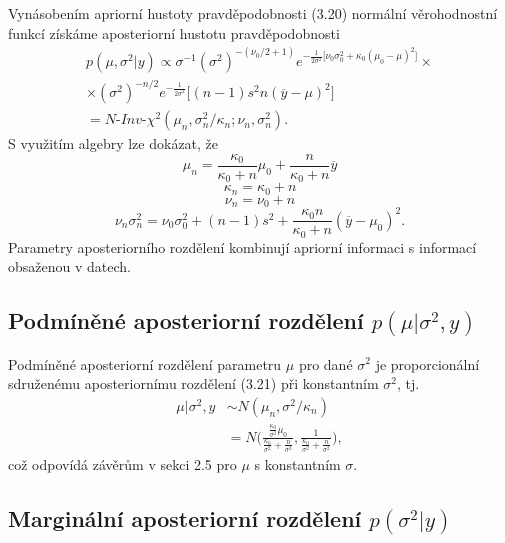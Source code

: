 Vynásobením apriorní hustoty pravděpodobnosti (3.20) normální věrohodnostní funkcí získáme aposteriorní hustotu pravděpodobnosti
\begin{multline}
p(\mu, \sigma^2 | y) \varpropto \sigma ^ {-1} (\sigma^2)^{-(\nu_0 / 2 + 1)}e^{-\frac{1}{2 \sigma ^ 2}\big[\nu_0 \sigma_0 ^ 2 + \kappa_0 (\mu_0 - \mu)^2 \big]} \times \\
\times (\sigma ^ 2) ^ {-n/2} e ^ {- \frac{1}{2 \sigma^2}}\big[(n - 1) s^2 n(\overline{y} - \mu) ^ 2 \big]\\
= \textit{N-Inv-}\chi^2(\mu_n, \sigma^2_n/ \kappa_n; \nu_n, \sigma_n^2).
\end{multline}
S využitím algebry lze dokázat, že
\begin{equation}
\mu_n = \frac{\kappa_0}{\kappa_0 + n}\mu_0 + \frac{n}{\kappa_0 + n} \overline{y}
\end{equation}
\begin{equation}
\kappa_n = \kappa_0 + n
\end{equation}
\begin{equation}
\nu_n = \nu_0 + n
\end{equation}
\begin{equation}
\nu_n \sigma^2_n = \nu_0 \sigma^2_0 + (n - 1)s^2 + \frac{\kappa_0 n}{\kappa_0 + n}(\overline{y} - \mu_0)^2.
\end{equation}
Parametry aposteriorního rozdělení kombinují apriorní informaci s informací obsaženou v datech.

\subsection{Podmíněné aposteriorní rozdělení $p(\mu | \sigma^2, y)$}

Podmíněné aposteriorní rozdělení parametru $\mu$ pro dané $\sigma^2$ je proporcionální sdruženému aposteriornímu rozdělení (3.21) při konstantním $\sigma^2$, tj.
\begin{equation}
\begin{split}
\mu | \sigma^2, y & \sim N(\mu_n, \sigma^2 / \kappa_n)\\
 & = N \Big(\frac{\frac{\kappa_0}{\sigma^2}\mu_0}{\frac{\kappa_0}{\sigma^2} + \frac{n}{\sigma^2}}, \frac{1}{\frac{\kappa_0}{\sigma^2} + \frac{n}{\sigma^2}} \Big),
\end{split}
\end{equation}
což odpovídá závěrům v sekci 2.5 pro $\mu$ s konstantním $\sigma$.

\subsection{Marginální aposteriorní rozdělení $p(\sigma^2 | y)$}

